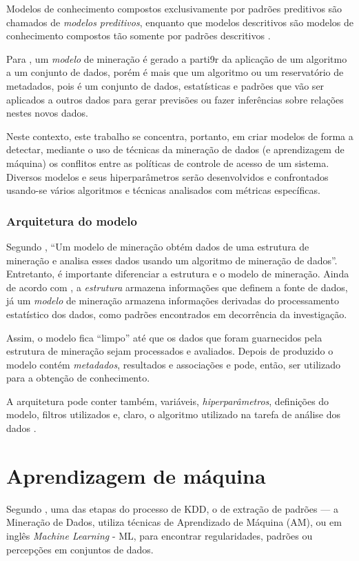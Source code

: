 Modelos de conhecimento compostos exclusivamente por padrões preditivos são chamados de \textit{modelos preditivos}, enquanto que modelos descritivos são modelos de conhecimento compostos tão somente por padrões descritivos \cite{Boscarioli2017}.

Para , um \textit{modelo} de mineração é gerado a parti9r da aplicação de um algoritmo a um conjunto de dados, porém é mais que um algoritmo ou um reservatório de metadados, pois é um conjunto de dados, estatísticas e padrões que vão ser aplicados a outros dados para gerar previsões ou fazer inferências sobre relações nestes novos dados.

Neste contexto, este trabalho se concentra, portanto, em criar modelos de forma a detectar, mediante o uso de técnicas da mineração de dados (e aprendizagem de máquina) os conflitos entre as políticas de controle de acesso de um sistema. Diversos modelos e seus hiperparâmetros serão desenvolvidos e confrontados usando-se vários algoritmos e técnicas analisados com métricas específicas.

\subsubsection{Arquitetura do modelo}\label{arquitetura_modelo}

Segundo , ``Um modelo de mineração obtém dados de uma estrutura de mineração e analisa esses dados usando um algoritmo de mineração de dados''. Entretanto, é importante diferenciar a estrutura e o modelo de mineração. Ainda de acordo com , a \textit{estrutura} armazena informações que definem a fonte de dados, já um \textit{modelo} de mineração armazena informações derivadas do processamento estatístico dos dados, como padrões encontrados em decorrência da investigação.

Assim, o modelo fica ``limpo'' até que os dados que foram guarnecidos pela estrutura de mineração sejam processados e avaliados. Depois de produzido o modelo contém \textit{metadados}, resultados e associações e pode, então, ser utilizado para a obtenção de conhecimento.

A arquitetura pode conter também, variáveis, \textit{hiperparâmetros}, definições do modelo, filtros utilizados e, claro, o algoritmo utilizado na tarefa de análise dos dados \cite{deep_learning_book_2019}.

\section{Aprendizagem de máquina} \label{aprendizagem_maquina}
Segundo , uma das etapas do processo de KDD, o de extração de padrões --- a Mineração de Dados, utiliza técnicas de Aprendizado de Máquina (AM), ou em inglês \textit{Machine Learning} - ML, para encontrar regularidades, padrões ou percepções  em conjuntos de dados.

